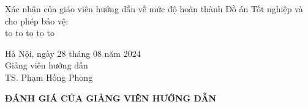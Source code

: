 \noindent Xác nhận của giáo viên hướng dẫn về mức độ hoàn thành Đồ án Tốt nghiệp và cho phép bảo vệ:\\
\noindent\leavevmode\hbox to \textwidth{\dotfill}
\noindent\leavevmode\hbox to \textwidth{\dotfill}
\noindent\leavevmode\hbox to \textwidth{\dotfill}
\noindent\leavevmode\hbox to \textwidth{\dotfill}
\noindent\leavevmode\hbox to \textwidth{\dotfill}
\vspace{1cm}

\begin{flushright}
    Hà Nội, ngày 28 tháng 08 năm 2024\\
    Giảng viên hướng dẫn\hspace{1cm}\text{ }\\
    \vspace{2cm}
    TS. Phạm Hồng Phong\hspace{0.8cm}\text{ }\\
\end{flushright}


\newpage
\begin{center}
    \textbf{\large \textbf{ĐÁNH GIÁ CỦA GIẢNG VIÊN HƯỚNG DẪN}}
\end{center}
\vspace{1cm}

